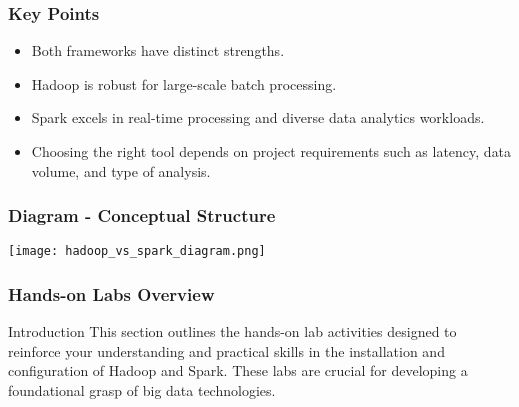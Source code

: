 \documentclass[aspectratio=169]{beamer}
\begin{document}
\begin{frame}[fragile]
    \frametitle{Key Points}
    \begin{itemize}
        \item Both frameworks have distinct strengths.
        \item Hadoop is robust for large-scale batch processing.
        \item Spark excels in real-time processing and diverse data analytics workloads.
        \item Choosing the right tool depends on project requirements such as latency, data volume, and type of analysis.
    \end{itemize}
\end{frame}

\begin{frame}[fragile]
    \frametitle{Diagram - Conceptual Structure}
    \begin{center}
        \texttt{[image: hadoop\_vs\_spark\_diagram.png]} %
    \end{center}
\end{frame}

\begin{frame}[fragile]
    \frametitle{Hands-on Labs Overview}
    \begin{block}{Introduction}
        This section outlines the hands-on lab activities designed to reinforce your understanding and practical skills in the installation and configuration of Hadoop and Spark. These labs are crucial for developing a foundational grasp of big data technologies.
    \end{block}
\end{frame}
\end{document}

